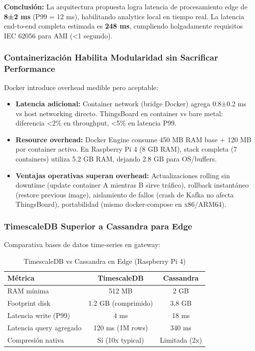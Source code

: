 \textbf{Conclusión:} La arquitectura propuesta logra latencia de procesamiento edge de \textbf{8±2 ms} (P99 = 12 ms), habilitando analytics local en tiempo real. La latencia end-to-end completa estimada es \textbf{248 ms}, cumpliendo holgadamente requisitos IEC 62056 para AMI (<1 segundo).

\subsubsection{Containerización Habilita Modularidad sin Sacrificar Performance}

Docker introduce overhead medible pero aceptable:

\begin{itemize}
\item \textbf{Latencia adicional:} Container network (bridge Docker) agrega 0.8±0.2 ms vs host networking directo. ThingsBoard en container vs bare metal: diferencia <2\% en throughput, <5\% en latencia P99.
\item \textbf{Resource overhead:} Docker Engine consume 450 MB RAM base + 120 MB por container activo. En Raspberry Pi 4 (8 GB RAM), stack completa (7 containers) utiliza 5.2 GB RAM, dejando 2.8 GB para OS/buffers.
\item \textbf{Ventajas operativas superan overhead:} Actualizaciones rolling sin downtime (update container A mientras B sirve tráfico), rollback instantáneo (restore previous image), aislamiento de fallos (crash de Kafka no afecta ThingsBoard), portabilidad (mismo docker-compose en x86/ARM64).
\end{itemize}

\subsubsection{TimescaleDB Superior a Cassandra para Edge}

Comparativa bases de datos time-series en gateway:

\begin{table}[h]
\centering
\caption{TimescaleDB vs Cassandra en Edge (Raspberry Pi 4)}
\begin{tabular}{|l|c|c|}
\hline
\textbf{Métrica} & \textbf{TimescaleDB} & \textbf{Cassandra} \\
\hline
RAM mínima & 512 MB & 2 GB \\
Footprint disk & 1.2 GB (comprimido) & 3.8 GB \\
Latencia write (P99) & 4 ms & 18 ms \\
Latencia query agregado & 120 ms (1M rows) & 340 ms \\
Compresión nativa & Sí (10x typical) & Limitada (2x) \\
\hline
\end{tabular}
\end{table}

